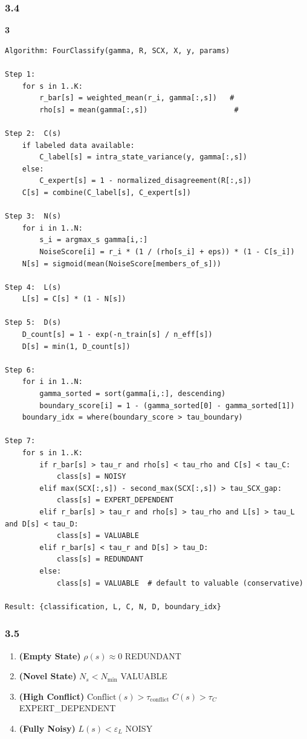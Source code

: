 \documentclass[
  12pt,
]{article}
\providecommand{\tightlist}{%
  \setlength{\itemsep}{0pt}\setlength{\parskip}{0pt}}
\begin{document}
\subsubsection{3.4 }\label{ux5b9eux73b0ux65b9ux6cd5-2}

\textbf{ 3}

\begin{verbatim}
Algorithm: FourClassify(gamma, R, SCX, X, y, params)

Step 1: 
    for s in 1..K:
        r_bar[s] = weighted_mean(r_i, gamma[:,s])   # 
        rho[s] = mean(gamma[:,s])                    # 

Step 2:  C(s)
    if labeled data available:
        C_label[s] = intra_state_variance(y, gamma[:,s])
    else:
        C_expert[s] = 1 - normalized_disagreement(R[:,s])
    C[s] = combine(C_label[s], C_expert[s])

Step 3:  N(s)
    for i in 1..N:
        s_i = argmax_s gamma[i,:]
        NoiseScore[i] = r_i * (1 / (rho[s_i] + eps)) * (1 - C[s_i])
    N[s] = sigmoid(mean(NoiseScore[members_of_s]))

Step 4:  L(s)
    L[s] = C[s] * (1 - N[s])

Step 5:  D(s)
    D_count[s] = 1 - exp(-n_train[s] / n_eff[s])
    D[s] = min(1, D_count[s])

Step 6: 
    for i in 1..N:
        gamma_sorted = sort(gamma[i,:], descending)
        boundary_score[i] = 1 - (gamma_sorted[0] - gamma_sorted[1])
    boundary_idx = where(boundary_score > tau_boundary)

Step 7: 
    for s in 1..K:
        if r_bar[s] > tau_r and rho[s] < tau_rho and C[s] < tau_C:
            class[s] = NOISY
        elif max(SCX[:,s]) - second_max(SCX[:,s]) > tau_SCX_gap:
            class[s] = EXPERT_DEPENDENT
        elif r_bar[s] > tau_r and rho[s] > tau_rho and L[s] > tau_L and D[s] < tau_D:
            class[s] = VALUABLE
        elif r_bar[s] < tau_r and D[s] > tau_D:
            class[s] = REDUNDANT
        else:
            class[s] = VALUABLE  # default to valuable (conservative)

Result: {classification, L, C, N, D, boundary_idx}
\end{verbatim}

\subsubsection{3.5
}\label{ux8fb9ux754cux60c5ux51b5ux5904ux7406}

\begin{enumerate}
\def\labelenumi{\arabic{enumi}.}
\tightlist
\item
  \textbf{ (Empty State)} \(\rho(s) \approx 0\)
  REDUNDANT
\item
  \textbf{ (Novel State)} \(N_s < N_{\min}\)
  VALUABLE
\item
  \textbf{ (High Conflict)}
  \(\text{Conflict}(s) > \tau_{\text{conflict}}\) 
  \(C(s) > \tau_C\) EXPERT\_DEPENDENT
\item
  \textbf{ (Fully Noisy)}
  \(L(s) < \varepsilon_L\) NOISY
\end{enumerate}
\end{document}
